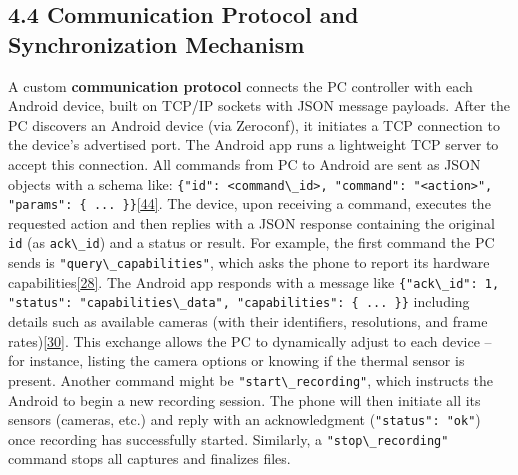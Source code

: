 \documentclass[12pt,a4paper]{article}
\begin{document}
\subsection{4.4 Communication Protocol and Synchronization Mechanism}\label{communication-protocol-and-synchronization-mechanism}

A custom \textbf{communication protocol} connects the PC controller with each Android device, built on TCP/IP sockets with JSON message payloads. After the PC discovers an Android device (via Zeroconf), it initiates a TCP connection to the device's advertised port. The Android app runs a lightweight TCP server to accept this connection. All commands from PC to Android are sent as JSON objects with a schema like: \passthrough{\lstinline!\{"id": <command\_id>, "command": "<action>", "params": \{ ... \}\}!}\href{https://github.com/buccancs/GSR-Dual-Video-System/blob/05ae360cb7b4ae7c7861f72deb235ad64a74b38e/pc_controller/src/main/main.py\#L89-L97}{{[}44{]}}. The device, upon receiving a command, executes the requested action and then replies with a JSON response containing the original \passthrough{\lstinline!id!} (as \passthrough{\lstinline!ack\_id!}) and a status or result. For example, the first command the PC sends is \passthrough{\lstinline!"query\_capabilities"!}, which asks the phone to report its hardware capabilities\href{https://github.com/buccancs/GSR-Dual-Video-System/blob/05ae360cb7b4ae7c7861f72deb235ad64a74b38e/pc_controller/src/main/main.py\#L53-L61}{{[}28{]}}. The Android app responds with a message like \passthrough{\lstinline!\{"ack\_id": 1, "status": "capabilities\_data", "capabilities": \{ ... \}\}!} including details such as available cameras (with their identifiers, resolutions, and frame rates)\href{https://github.com/buccancs/GSR-Dual-Video-System/blob/05ae360cb7b4ae7c7861f72deb235ad64a74b38e/pc_controller/src/main/main.py\#L74-L81}{{[}30{]}}. This exchange allows the PC to dynamically adjust to each device -- for instance, listing the camera options or knowing if the thermal sensor is present. Another command might be \passthrough{\lstinline!"start\_recording"!}, which instructs the Android to begin a new recording session. The phone will then initiate all its sensors (cameras, etc.) and reply with an acknowledgment (\passthrough{\lstinline!"status": "ok"!}) once recording has successfully started. Similarly, a \passthrough{\lstinline!"stop\_recording"!} command stops all captures and finalizes files.
\end{document}
